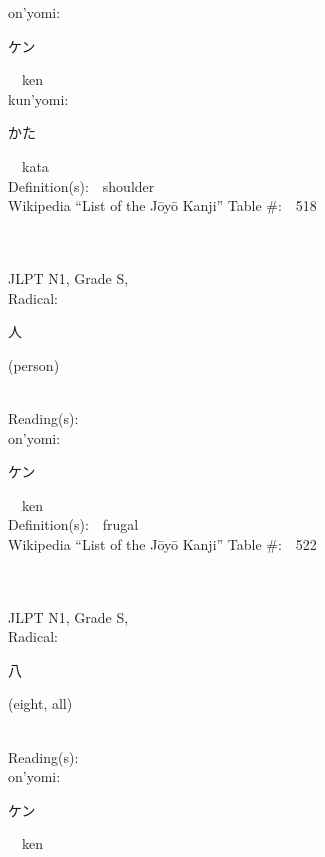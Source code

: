 \begin{multicols}{2}
{\hspace*{1em}}on'yomi:\ \ \\
{\hspace*{2em}}{\begin{CJK}{UTF8}{min} ケン \end{CJK}}\ \ ken\ \ \\
{\hspace*{1em}}kun'yomi:\ \ \\
{\hspace*{2em}}{\begin{CJK}{UTF8}{min} かた \end{CJK}}\ \ kata\ \ \\
Definition(s):\ \ shoulder \\
Wikipedia ``List of the J\=oy\=o Kanji'' Table \#:\ \ 518 \\
\ \ \\
{\fontsize{34pt}{40pt}  }\ \ \\
{JLPT N1, Grade S, \\Radical:\ \ {\begin{CJK}{UTF8}{min} 人 \end{CJK}} (person) } \\
Reading(s):\ \ \\
{\hspace*{1em}}on'yomi:\ \ \\
{\hspace*{2em}}{\begin{CJK}{UTF8}{min} ケン \end{CJK}}\ \ ken\ \ \\
Definition(s):\ \ frugal \\
Wikipedia ``List of the J\=oy\=o Kanji'' Table \#:\ \ 522 \\
\ \ \\
{\fontsize{34pt}{40pt}  }\ \ \\
{JLPT N1, Grade S, \\Radical:\ \ {\begin{CJK}{UTF8}{min} 八 \end{CJK}} (eight, all) } \\
Reading(s):\ \ \\
{\hspace*{1em}}on'yomi:\ \ \\
{\hspace*{2em}}{\begin{CJK}{UTF8}{min} ケン \end{CJK}}\ \ ken\ \ \\

\end{multicols}
